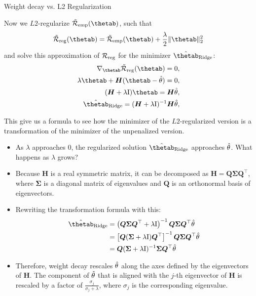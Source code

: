 \begin{vbframe}{Weight decay vs. L2 Regularization}
\lz

Now we $L2$-regularize $\mathcal{\tilde R}_{\text{emp}}(\thetab)$, such that 
\[
\mathcal{\tilde R}_{\text{reg}}(\thetab) = \mathcal{\tilde R}_{\text{emp}}(\thetab) + \frac{\lambda}{2} \|\thetab\|^2_2\]
and solve this approximation of $\mathcal{R}_{\text{reg}}$ for the minimizer $\hat{\thetab}_{\text{Ridge}}$:
\begin{align*}
 \nabla_{\thetab}\mathcal{\tilde R}_{\text{reg}}(\thetab) = 0,\\
  \lambda \thetab + \bm{H}(\thetab - \thetah) = 0,\\
      (\bm{H} + \lambda \id) \thetab = \bm{H} \thetah,\\
      \hat{\thetab}_{\text{Ridge}} = (\bm{H} + \lambda \id)^{-1}\bm{H} \thetah,
\end{align*}

This give us a formula to see how the minimizer of the $L2$-regularized version is a transformation of the minimizer of the unpenalized version.


\framebreak

  \begin{itemize}
    \item As $\lambda$ approaches $0$, the regularized solution $\hat{\thetab}_{\text{Ridge}}$ approaches $\hat{\theta}$. What happens as $\lambda$ grows?
    \item Because $\bm{H}$ is a real symmetric matrix, it can be decomposed as $\bm{H} = \bm{Q} \bm{\Sigma} \bm{Q}^\top$, where $\bm{\Sigma}$ is a diagonal matrix of eigenvalues and $\bm{Q}$ is an orthonormal basis of eigenvectors.
    \item Rewriting the transformation formula with this:
  \begin{equation*}
    \begin{aligned} 
    \hat{\thetab}_{\text{Ridge}} &=\left(\bm{Q} \bm{\Sigma} \bm{Q}^{\top}+\lambda \id\right)^{-1} \bm{Q} \bm{\Sigma} \bm{Q}^{\top} \thetah \\ 
              &=\left[\bm{Q}(\bm{\Sigma}+\lambda \id) \bm{Q}^{\top}\right]^{-1} \bm{Q} \bm{\Sigma} \bm{Q}^{\top} \thetah \\ 
              &=\bm{Q}(\bm{\Sigma} + \lambda \id)^{-1} \bm{\Sigma} \bm{Q}^{\top} \thetah 
    \end{aligned}
  \end{equation*}
    \item Therefore, weight decay rescales $\hat{\theta}$ along the axes defined by the eigenvectors of $\bm{H}$. The component of $\hat{\theta}$ that is aligned with the $j$-th eigenvector of $\bm{H}$ is rescaled by a factor of $\frac{\sigma_j}{\sigma_j + \lambda}$, where $\sigma_j$ is the corresponding eigenvalue.
\end{itemize}


\end{vbframe}
